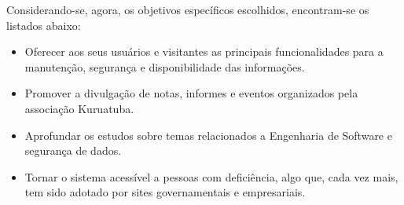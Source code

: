 Considerando-se, agora, os objetivos específicos escolhidos, encontram-se os listados abaixo:  
\begin{itemize}
 \item Oferecer aos seus usuários e visitantes as principais funcionalidades para a manutenção, segurança e disponibilidade das informações.
 
 \item Promover a divulgação de notas, informes e eventos organizados pela associação Kuruatuba.
 
 \item Aprofundar os estudos sobre temas relacionados a Engenharia de Software e segurança de dados.
 
 \item Tornar o sistema acessível a pessoas com deficiência, algo que, cada vez mais, tem sido adotado por sites governamentais e empresariais. 
\end{itemize}



